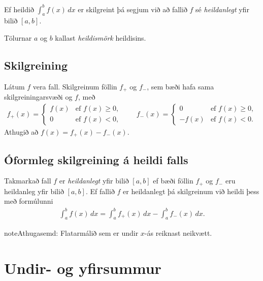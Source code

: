 \documentclass[b5paper,11pt,icelandic]{sphinxmanual}
\begin{document}
Ef heildið \(\int_a^b f(x)\,dx\) er skilgreint þá segjum við að
fallið \(f\) sé \textit{heildanlegt} yfir bilið \([a,b]\).

Tölurnar \(a\) og \(b\) kallast \textit{heildismörk} heildisins.


\subsection{Skilgreining}
\label{kafli06:skilgreining}
Látum \(f\) vera fall. Skilgreinum föllin \(f_+\) og
\(f_-\), sem bæði hafa sama skilgreiningarsvæði og \(f\), með
\begin{equation*}
\begin{split}f_+(x)=\left\{\begin{array}{ll} f(x) & \mbox{ef }f(x)\geq 0,\\
  0 & \mbox{ef }f(x)<0, \end{array} \right. \qquad
  f_-(x)=\left\{\begin{array}{ll} 0 & \mbox{ef }f(x)\geq 0,\\
  -f(x) & \mbox{ef }f(x)<0. \end{array}\right.\end{split}
\end{equation*}
Athugið að \(f(x)=f_+(x)-f_-(x)\).



\subsection{Óformleg skilgreining á heildi falls}
\label{kafli06:oformleg-skilgreining-a-heildi-falls}
Takmarkað fall \(f\) er \emph{heildanlegt} yfir bilið \([a, b]\) ef
bæði föllin \(f_+\) og \(f_-\) eru heildanleg yfir bilið
\([a,
b]\). Ef fallið \(f\) er heildanlegt þá skilgreinum við heildi þess
með formúlunni
\begin{equation*}
\begin{split}\int_a^b f(x)\,dx=\int_a^b f_+(x)\,dx-\int_a^b f_-(x)\,dx.\end{split}
\end{equation*}
\begin{notice}{note}{Athugasemd:}
Flatarmálið sem er undir \(x\)-ás reiknast neikvætt.
\end{notice}


\section{Undir- og yfirsummur}
\label{kafli06:undir-og-yfirsummur}
\end{document}
